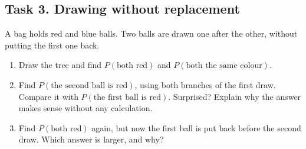 \subsection*{Task 3. Drawing without replacement}
A bag holds \hwRed{} red and \hwBlue{} blue balls. Two balls are drawn one after the other, without putting the first
one back.
\begin{enumerate}[label=(\alph*)]
  \item Draw the tree and find $P(\text{both red})$ and $P(\text{both the same colour})$.
  \item Find $P(\text{the second ball is red})$, using both branches of the first draw. Compare it with
        $P(\text{the first ball is red})$. Surprised? Explain why the answer makes sense without any calculation.
  \item Find $P(\text{both red})$ again, but now the first ball is put back before the second draw. Which answer is
        larger, and why?
\end{enumerate}

